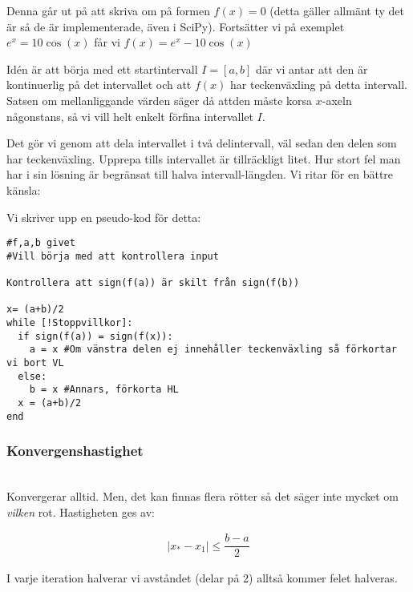 \noindent Denna går ut på att skriva om på formen $f(x) = 0$ (detta gäller allmänt ty det är så de är implementerade, även i SciPy). Fortsätter vi på exemplet $e^x = 10\cos(x)$ får vi $f(x) = e^x -10\cos(x)$
\par\bigskip
\noindent Idén är att börja med ett startintervall $I = [a,b]$ där vi antar att den är kontinuerlig på det intervallet och att $f(x)$ har teckenväxling på detta intervall. Satsen om mellanliggande värden säger då attden måste korsa $x$-axeln någonstans, så vi vill helt enkelt förfina intervallet $I$.
\par\bigskip
\noindent Det gör vi genom att dela intervallet i två delintervall, väl sedan den delen som har teckenväxling. Upprepa tills intervallet är tillräckligt litet. Hur stort fel man har i sin lösning är begränsat till halva intervall-längden. Vi ritar för en bättre känsla:

\begin{center}
\end{center}

\par\bigskip
\noindent Vi skriver upp en pseudo-kod för detta:

\begin{verbatim}
#f,a,b givet
#Vill börja med att kontrollera input

Kontrollera att sign(f(a)) är skilt från sign(f(b))

x= (a+b)/2
while [!Stoppvillkor]:
  if sign(f(a)) = sign(f(x)):
    a = x #Om vänstra delen ej innehåller teckenväxling så förkortar vi bort VL
  else:
    b = x #Annars, förkorta HL
  x = (a+b)/2
end
\end{verbatim}

\subsubsection{Konvergenshastighet}\hfill\\

\noindent Konvergerar alltid. Men, det kan finnas flera rötter så det säger inte mycket om \textit{vilken} rot. Hastigheten ges av:
\par\bigskip

\begin{equation*}
  \begin{gathered}
    \left|x_*-x_1\right|\leq\dfrac{b-a}{2}
  \end{gathered}
\end{equation*}
\par\bigskip
\noindent I varje iteration halverar vi avståndet (delar på 2) alltså kommer felet halveras.
\par\bigskip


